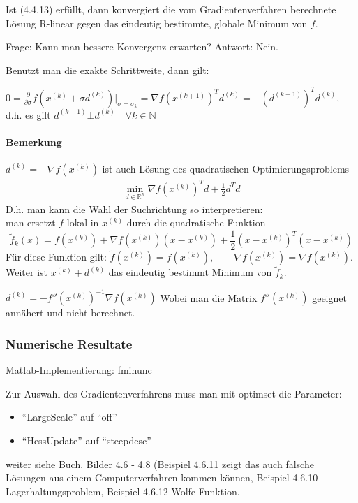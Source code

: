 \documentclass[ngerman,halfparskip]{scrartcl}
\theoremstyle{definition}
\def\R{\mathbb R}
\begin{document}
Ist (4.4.13) erfüllt, dann konvergiert die vom Gradientenverfahren berechnete Lösung R-linear gegen das eindeutig bestimmte, globale Minimum von $f$. 

Frage: Kann man bessere Konvergenz erwarten? Antwort: Nein.

Benutzt man die exakte Schrittweite, dann gilt:

$0=\frac\partial{\partial\sigma}f\left(x^{(k)}+\sigma d^{(k)}\right)|_{\sigma=\sigma_k}=\nabla f(x^{(k+1)})^Td^{(k)}=-(d^{(k+1)})^Td^{(k)}$, d.h. es gilt $d^{(k+1)}\bot d^{(k)} \quad \forall k\in\mathbb N$

\paragraph{Bemerkung} $d^{(k)}=-\nabla f (x^{(k)})$ ist auch Lösung des quadratischen Optimierungsproblems
\begin{gather*}\tag{Q$_k$}
\min\limits_{d\in\R^n}\nabla f(x^{(k)})^Td+\frac 12 d^Td 
\end{gather*}
D.h. man kann die Wahl der Suchrichtung so interpretieren: \\
man ersetzt $f$ lokal in $x^{(k)}$ durch die quadratische Funktion\\
$$\tilde f_k(x)=f(x^{(k)})+\nabla f (x^{(k)})(x-x^{(k)})+\frac 12 (x-x^{(k)})^T(x-x^{(k)})$$
Für diese Funktion gilt: $\tilde f (x^{(k)})=f(x^{(k)}),\qquad \nabla f(x^{(k)})=\nabla f(x^{(k)})$. Weiter ist $x^{(k)}+d^{(k)}$ das eindeutig bestimmt Minimum von $\tilde f _k$.

$d^{(k)}=-f''(x^{(k)})^{-1}\nabla f(x^{(k)})$ Wobei man die Matrix $f''(x^{(k)})$ geeignet annähert und nicht berechnet.

\subsubsection{Numerische Resultate}
Matlab-Implementierung: fminunc

Zur Auswahl des Gradientenverfahrens muss man mit optimset die Parameter:
\begin{itemize}
\item "`LargeScale"' auf "`off"'
\item "`HessUpdate"' auf "`steepdesc"'
\end{itemize}

weiter siehe Buch. Bilder 4.6 - 4.8  (Beispiel 4.6.11 zeigt das auch falsche Lösungen aus einem Computerverfahren kommen können, Beispiel 4.6.10 Lagerhaltungsproblem, Beispiel 4.6.12 Wolfe-Funktion.
\end{document}
